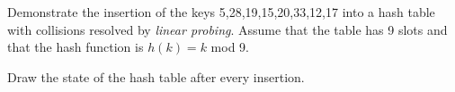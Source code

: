 Demonstrate the insertion of the keys 5,28,19,15,20,33,12,17 into a
hash table with collisions resolved by {\em linear probing}. Assume that the
table has 9 slots and that the hash function is $h(k) = k$ mod 9.

Draw the state of the hash table after every insertion.
